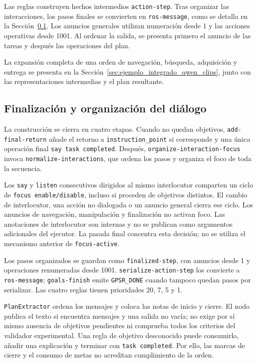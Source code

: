Las reglas construyen hechos intermedios \texttt{action-step}. Tras
organizar las interacciones, los pasos finales se convierten en
\texttt{ros-message}, como se detalla en la
Sección~\ref{subsec:finalizacion_clips_impl}. Los anuncios
generales utilizan numeración desde 1 y las acciones operativas desde
1001. Al ordenar la salida, se presenta primero el anuncio de las tareas
y después las operaciones del plan.

La expansión completa de una orden de navegación, búsqueda, adquisición
y entrega se presenta en la Sección~\ref{sec:ejemplo_integrado_qwen_clips},
junto con las representaciones intermedias y el plan resultante.

\subsection{Finalización y organización del diálogo}
\label{subsec:finalizacion_clips_impl}

La construcción se cierra en cuatro etapas. Cuando no quedan objetivos,
\texttt{add-\allowbreak final-\allowbreak return} añade el retorno a
\texttt{instruction\_\allowbreak point} si corresponde y una única operación final
\texttt{say task completed}. Después,
\texttt{organize-\allowbreak interaction-\allowbreak focus} invoca
\texttt{normalize-\allowbreak interactions}, que ordena los pasos y organiza
el foco de toda la secuencia.

Los \texttt{say} y \texttt{listen} consecutivos dirigidos al mismo
interlocutor comparten un ciclo de \texttt{focus enable/\allowbreak disable},
incluso si proceden de objetivos distintos. El cambio de interlocutor,
una acción no dialogada o un anuncio general cierra ese ciclo.
Los anuncios de navegación, manipulación y finalización no activan foco.
Las anotaciones de interlocutor son internas y no se publican como
argumentos adicionales del ejecutor. La pasada final concentra esta
decisión; no se utiliza el mecanismo anterior de \texttt{focus-active}.

Los pasos organizados se guardan como \texttt{finalized-\allowbreak step}, con
anuncios desde 1 y operaciones renumeradas desde 1001.
\texttt{serialize-\allowbreak action-\allowbreak step} los convierte a \texttt{ros-message};
\texttt{goals-finish} emite \texttt{GPSR\_DONE} cuando tampoco quedan
pasos por serializar. Las cuatro reglas tienen prioridades 20, 7, 5 y 1.

\texttt{PlanExtractor} ordena los mensajes y coloca las notas de inicio
y cierre. El nodo publica el texto si encuentra mensajes y una salida
no vacía; no exige por sí mismo ausencia de objetivos pendientes ni
comprueba todos los criterios del validador experimental.
Una regla de objetivo desconocido puede consumirlo, añadir una explicación
y terminar con \texttt{task completed}. Por ello, las marcas de cierre
y el consumo de metas no acreditan cumplimiento de la orden.

